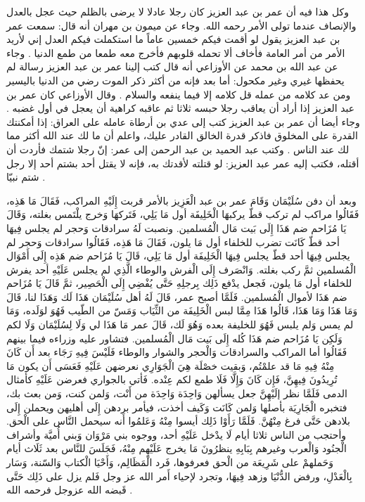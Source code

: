 وكل هذا فيه أن عمر بن عبد العزيز كان رجلا عادلا لا يرضى بالظلم حيث عجل بالعدل والإنصاف عندما تولى الأمر رحمه الله. وجاء عن ميمون بن مهران أنه قال: سمعت عمر بن عبد العزيز يقول لو أقمت فيكم خمسين عاماً ما استكملت فيكم العدل إني لأريد الأمر من أمر العامة فأخاف ألا تحمله قلوبهم فأخرج معه طمعا من طمع الدنيا \cite{dahabi_Siyar}. وجاء عن عبد الله بن محمد عن الأوزاعي أنه قال كتب إلينا عمر بن عبد العزيز رسالة لم يحفظها غيري وغير مكحول: أما بعد فإنه من أكثر ذكر الموت رضي من الدنيا باليسير ومن عد كلامه من عمله قل كلامه إلا فيما ينفعه والسلام \cite{dahabi_Siyar}. وقال الأوزاعي كان عمر بن عبد العزيز إذا أراد أن يعاقب رجلا حبسه ثلاثا ثم عاقبه كراهية أن يعجل في أول غضبه \cite{dahabi_Siyar}. وجاء أيضا أن عمر بن عبد العزيز كتب إلى عدي بن أرطاة عامله على العراق: إذا أمكنتك القدرة على المخلوق فاذكر قدرة الخالق القادر عليك، واعلم أن ما لك عند الله أكثر مما لك عند الناس \cite{ibnAbdRabbih_AlIqd}. وكتب عبد الحميد بن عبد الرحمن إلى عمر: إنّ رجلا شتمك فأردت أن أقتله، فكتب إليه عمر عبد العزيز: لو قتلته لأقدتك به، فإنه لا يقتل أحد بشتم أحد إلا رجل شتم نبيّا \cite{ibnAbdRabbih_AlIqd}.

وبعد أن دفن سُلَيْمَان وَقَامَ عمر بن عبد الْعَزِيز بالأمر قربت إِلَيْهِ المراكب، فَقَالَ مَا هَذِه، فَقَالُوا مراكب لم تركب قطّ يركبهَا الْخَلِيفَة أول مَا يَلِي، فَتَركهَا وَخرج يلْتَمس بغلته، وَقَالَ يَا مُزَاحم ضم هَذَا إِلَى بَيت مَال الْمُسلمين. ونصبت لَهُ سرادقات وَحجر لم يجلس فِيهَا أحد قطّ كَانَت تضرب للخلفاء أول مَا يلون، فَقَالَ مَا هَذِه، فَقَالُوا سرادقات وَحجر لم يجلس فِيهَا أحد قطّ يجلس فِيهَا الْخَلِيفَة أول مَا يَلِي، قَالَ يَا مُزَاحم ضم هَذِه إِلَى أَمْوَال الْمُسلمين ثمَّ ركب بغلته. وَانْصَرف إِلَى الْفرش والوطاء الَّذِي لم يجلس عَلَيْهِ أحد يفرش للخلفاء أول مَا يلون، فَجعل يدْفع ذَلِك بِرجلِهِ حَتَّى يُفْضِي إِلَى الْحَصِير، ثمَّ قَالَ يَا مُزَاحم ضم هَذَا لأموال الْمُسلمين. فَلَمَّا أصبح عمر، قَالَ لَهُ أهل سُلَيْمَان هَذَا لَك وَهَذَا لنا، قَالَ وَمَا هَذَا وَمَا هَذَا، قَالُوا هَذَا مِمَّا لبس الْخَلِيفَة من الثِّيَاب وَمَسّ من الطّيب فَهُوَ لوَلَده، وَمَا لم يمس وَلم يلبس فَهُوَ للخليفة بعده وَهُوَ لَك، قَالَ عمر مَا هَذَا لي وَلَا لِسُلَيْمَان وَلَا لكم وَلَكِن يَا مُزَاحم ضم هَذَا كُله إِلَى بَيت مَال الْمُسلمين. فتشاور عليه وزراءه فيما بينهم فَقَالُوا أما المراكب والسرادقات وَالْحجر والشوار والوطاء فَلَيْسَ فِيهِ رَجَاء بعد أَن كَانَ مِنْهُ فِيهِ مَا قد علمْتُم، وَبقيت خصْلَة هِيَ الْجَوَارِي نعرضهن عَلَيْهِ فَعَسَى أَن يكون مَا تُرِيدُونَ فِيهِنَّ، فَإِن كَانَ وَإِلَّا فَلَا طمع لكم عِنْده. فَأتي بالجواري فعرضن عَلَيْهِ كأمثال الدمى فَلَمَّا نظر إلَيْهِنَّ جعل يسألهن وَاحِدَة وَاحِدَة من أَنْت، وَلمن كنت، وَمن بعث بك، فتخبره الْجَارِيَة بأصلها وَلمن كَانَت وَكَيف أخذت، فيأمر بردهن إِلَى أهليهن ويحملن إِلَى بلادهن حَتَّى فرغ مِنْهُنَّ. فَلَمَّا رَأَوْا ذَلِك أيسوا مِنْهُ وَعَلمُوا أَنه سيحمل النَّاس على الْحق. وأحتجب من الناس ثلاثا أيام لَا يدْخل عَلَيْهِ أحد، ووجوه بني مَرْوَان وَبني أُميَّة وأشراف الْجنُود وَالْعرب وغيرهم بِبَابِهِ ينظرُونَ مَا يخرج عَلَيْهِم مِنْهُ، فَجَلَسَ للنَّاس بعد ثَلَاث أيام وَحَملهمْ على شَرِيعَة من الْحق فعرفوها، فَرد الْمَظَالِم، وَأَحْيَا الْكتاب وَالسّنة، وَسَار بِالْعَدْلِ، ورفض الدُّنْيَا وزهد فِيهَا، وتجرد لإحياء أَمر الله عز وجل فَلم يزل على ذَلِك حَتَّى قَبضه الله عزوجل فرحمه الله \cite{ibnAbdAlHakam_OmarIbnAbdAlAziz}.

